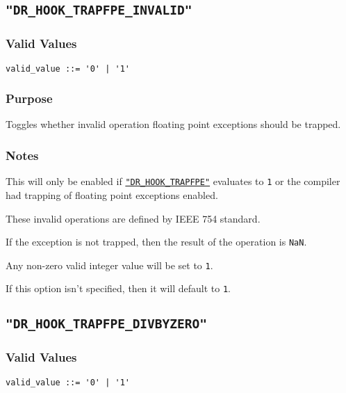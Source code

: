 \subsection{\texttt{"DR\_HOOK\_TRAPFPE\_INVALID"}}
\label{section:flags:DR_HOOK_TRAPFPE_INVALID}
\vspace{-2ex}
\subsubsection{Valid Values}
\vspace{-2ex}
\verb+valid_value ::= '0' | '1'+ 

\vspace{-2ex}
\subsubsection{Purpose}
\vspace{-2ex}
Toggles whether invalid operation floating point exceptions should be trapped.

\vspace{-2ex}
\subsubsection{Notes}
\vspace{-2ex}
This will only be enabled if \hyperref[section:flags:DR_HOOK_TRAPFPE]{\texttt{"DR\_HOOK\_TRAPFPE"}} evaluates to \texttt{1} or the compiler had trapping of floating point exceptions enabled.

These invalid operations are defined by IEEE 754 standard.

If the exception is not trapped, then the result of the operation is \verb|NaN|.

Any non-zero valid integer value will be set to \verb|1|.

If this option isn't specified, then it will default to \verb|1|.



\subsection{\texttt{"DR\_HOOK\_TRAPFPE\_DIVBYZERO"}}
\label{section:flags:}
\vspace{-2ex}
\subsubsection{Valid Values}
\vspace{-2ex}
\verb+valid_value ::= '0' | '1'+ 

